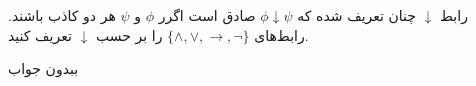 رابط $\downarrow$ چنان تعریف شده که $\phi\downarrow\psi$ صادق است اگرر $\phi$ و $\psi$ هر دو کاذب باشند. رابط‌های
$\{\wedge,\vee,\to,\neg\}$
را بر حسب $\downarrow$ تعریف کنید.
\begin{ans}
ببدون جواب
\end{ans}
